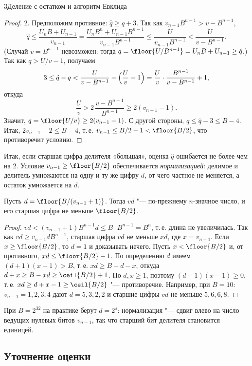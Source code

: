\begin{lecture}{3}{Деление с остатком и алгоритм Евклида}
\begin{proof}
2. Предположим противное: $\hat q \ge q + 3$. Так как $v_{n-1} B^{n-1} > v - B^{n-1}$,
\[
  \hat q \le \frac{U_n B + U_{n-1}}{v_{n-1}} = \frac{U_n B^n + U_{n-1} B^{n-1}}{v_{n-1} B^{n-1}}
  \le \frac{U}{v_{n-1} B^{n-1}} < \frac{U}{v - B^{n-1}}.
\]
(Случай $v = B^{n-1}$ невозможен: тогда $q = \floor{U/B^{n-1}} = U_n B + U_{n-1} \ge \hat q$.)
Так как $q > U/v - 1$, получаем
\[
  3 \le \hat q - q < \frac{U}{v - B^{n-1}} - \Bigl(\frac{U}{v} - 1\Bigr)
  = \frac{U}{v} \cdot \frac{B^{n-1}}{v - B^{n-1}} + 1,
\]
откуда
\[
  \frac{U}{v} > 2\,\frac{v - B^{n-1}}{B^{n-1}} \ge 2(v_{n-1} - 1).
\]
Значит, $q = \floor{U/v} \ge 2(v_{n-1} - 1)$. С другой стороны, $q \le \hat q - 3 \le B - 4$.
Итак, $2v_{n-1} - 2 \le B - 4$, т.\,е. $v_{n-1} \le B/2 - 1 < \floor{B/2}$, что противоречит
условию.
\end{proof}

Итак, если старшая цифра делителя «большая», оценка $\hat q$ ошибается не более чем на $2$.
Условие $v_{n-1} \ge \floor{B/2}$ обеспечивается \emph{нормализацией}: делимое и делитель
умножаются на одну и ту же цифру $d$, от чего частное не меняется, а остаток умножается на $d$.

\begin{lemma}\label{l3:normalize}
Пусть $d = \floor{B/(v_{n-1} + 1)}$. Тогда $vd$ "--- по-прежнему $n$-значное число, и его старшая
цифра не меньше $\floor{B/2}$.
\end{lemma}

\begin{proof}
$vd < (v_{n-1} + 1) B^{n-1} d \le B \cdot B^{n-1} = B^n$, т.\,е. длина не увеличилась. Так как
$vd \ge v_{n-1} d B^{n-1}$, старшая цифра $vd$ не меньше $x d$, где $x = v_{n-1}$. Если
$x \ge \floor{B/2}$, то $d = 1$ и доказывать нечего. Пусть $x < \floor{B/2}$ и, от противного,
$xd \le \floor{B/2} - 1$. По определению $d$ имеем $(d + 1)(x + 1) > B$, т.\,е.
$xd \ge B - d - x$, откуда $d + x \ge B - xd \ge \ceil{B/2} + 1$. Но $d, x \ge 1$, поэтому
$(d - 1)(x - 1) \ge 0$, т.\,е. $xd \ge d + x - 1 \ge \ceil{B/2}$ "--- противоречие. Например, при $B = 10$: $v_{n-1} = 1, 2, 3, 4$ дают $d = 5, 3, 2, 2$ и старшие цифры
$vd$ не меньше $5, 6, 6, 8$.
\end{proof}

При $B = 2^{32}$ на практике берут $d = 2^s$: нормализация "--- сдвиг влево на число ведущих
нулевых битов $v_{n-1}$, так что старший бит делителя становится единицей.

\subsection{Уточнение оценки}


\end{lecture}
